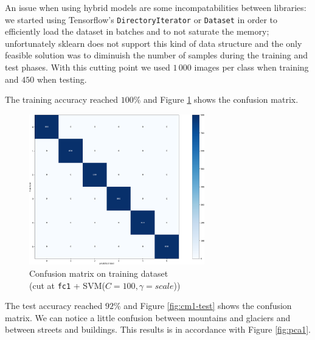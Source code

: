 \documentclass[compsoc]{IEEEtran}
\begin{document}
An issue when using hybrid models are some incompatabilities between libraries: we started using Tensorflow's \texttt{DirectoryIterator} or \texttt{Dataset} in order to efficiently load the dataset in batches and to not saturate the memory; unfortunately sklearn does not support this kind of data structure and the only feasible solution was to diminuish the number of samples during the training and test phases. With this cutting point we used $1\,000$ images per class when training and $450$ when testing. \par
The training accuracy reached $100\%$ and Figure \ref{fig:cm1-train} shows the confusion matrix. 


\begin{figure}[ht!]
\centering                                                                        
\includegraphics[width=3in]{../images/cm1-train.png}
\captionsetup{justification=centering}                                                                                         
\caption{Confusion matrix on training dataset \\ (cut at \texttt{fc1} + SVM($C=100, \gamma=scale$))}
\label{fig:cm1-train}                                                                                                                               
\end{figure}

The test accuracy reached $92\%$ and Figure \ref{fig:cm1-test} shows the confusion matrix. We can notice a little confusion between mountains and glaciers and between streets and buildings. This results is in accordance with Figure \ref{fig:pca1}.
\end{document}
